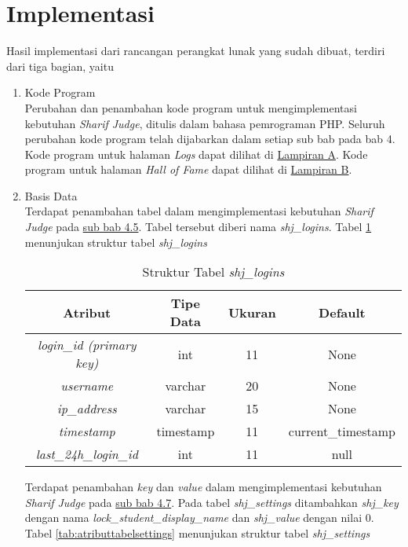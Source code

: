 \section{Implementasi}
Hasil implementasi dari rancangan perangkat lunak yang sudah dibuat, terdiri dari tiga bagian, yaitu
\begin{enumerate}
	\item Kode Program \\
	Perubahan dan penambahan kode program untuk mengimplementasi kebutuhan \textit{Sharif Judge}, ditulis dalam bahasa pemrograman PHP. Seluruh perubahan kode program telah dijabarkan dalam setiap sub bab pada bab 4. Kode program untuk halaman \textit{Logs} dapat dilihat di \hyperref[lamp:kodeprogramhalamanlogs]{Lampiran A}. Kode program untuk halaman \textit{Hall of Fame} dapat dilihat di \hyperref[lamp:kodeprogramhalamanhof]{Lampiran B}.
	
	\item Basis Data \\
	Terdapat penambahan tabel dalam mengimplementasi kebutuhan \textit{Sharif Judge} pada \hyperref[chap:logs]{sub bab 4.5}. Tabel tersebut diberi nama \textit{shj\_logins}. Tabel \ref{tab:tabellogsfix} menunjukan struktur tabel \textit{shj\_logins}
	\begin{table}[H] %
		\centering 
		\caption{Struktur Tabel \textit{shj\_logins}}
		\label{tab:tabellogsfix}
		\begin{tabular}{|c|c|c|c|}
			\hline
			\textbf{Atribut} & \textbf{Tipe Data} & \textbf{Ukuran}  & \textbf{Default} \\
			\hline
			\textit{login\_id (primary key)} & int & 11  & None \\
			\hline
			\textit{username} & varchar & 20  & None \\
			\hline
			\textit{ip\_address} & varchar & 15  & None \\
			\hline
			\textit{timestamp} & timestamp & 11  & current\_timestamp \\
			\hline
			\textit{last\_24h\_login\_id}	 & int & 11  & null \\
			\hline
		\end{tabular}
	\end{table}
	
	Terdapat penambahan \textit{key} dan \textit{value} dalam mengimplementasi kebutuhan \textit{Sharif Judge} pada \hyperref[chap:lock]{sub bab 4.7}. Pada tabel \textit{shj\_settings} ditambahkan \textit{shj\_key} dengan nama \textit{lock\_student\_display\_name} dan \textit{shj\_value} dengan nilai 0. Tabel \ref{tab:atributtabelsettings} menunjukan struktur tabel \textit{shj\_settings}
	

\end{enumerate}

